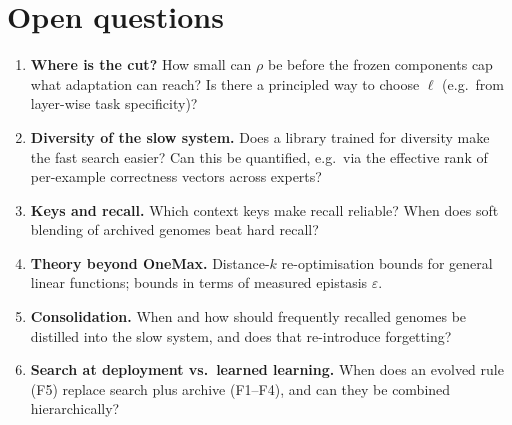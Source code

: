 \documentclass[11pt,a4paper]{article}
\theoremstyle{definition}
\theoremstyle{plain}
\theoremstyle{remark}
\begin{document}
\section{Open questions}
\label{sec:open}
\begin{enumerate}
\item \textbf{Where is the cut?} How small can $\rho$ be before the frozen components cap what adaptation can reach? Is there a principled way to choose $\ell$ (e.g.\ from layer-wise task specificity)?
\item \textbf{Diversity of the slow system.} Does a library trained for diversity make the fast search easier? Can this be quantified, e.g.\ via the effective rank of per-example correctness vectors across experts?
\item \textbf{Keys and recall.} Which context keys make recall reliable? When does soft blending of archived genomes beat hard recall?
\item \textbf{Theory beyond OneMax.} Distance-$k$ re-optimisation bounds for general linear functions; bounds in terms of measured epistasis $\varepsilon$.
\item \textbf{Consolidation.} When and how should frequently recalled genomes be distilled into the slow system, and does that re-introduce forgetting?
\item \textbf{Search at deployment vs.\ learned learning.} When does an evolved rule (F5) replace search plus archive (F1--F4), and can they be combined hierarchically?
\end{enumerate}
\end{document}
